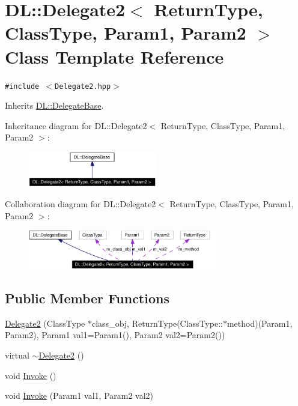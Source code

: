 \hypertarget{classDL_1_1Delegate2}{
\section{DL::Delegate2$<$ Return\-Type, Class\-Type, Param1, Param2 $>$ Class Template Reference}
\label{classDL_1_1Delegate2}
}
{\tt \#include $<$Delegate2.hpp$>$}

Inherits \hyperlink{classDL_1_1DelegateBase}{DL::Delegate\-Base}.

Inheritance diagram for DL::Delegate2$<$ Return\-Type, Class\-Type, Param1, Param2 $>$:\begin{figure}[H]
\begin{center}
\leavevmode
\includegraphics[width=158pt]{classDL_1_1Delegate2__inherit__graph}
\end{center}
\end{figure}
Collaboration diagram for DL::Delegate2$<$ Return\-Type, Class\-Type, Param1, Param2 $>$:\begin{figure}[H]
\begin{center}
\leavevmode
\includegraphics[width=234pt]{classDL_1_1Delegate2__coll__graph}
\end{center}
\end{figure}
\subsection*{Public Member Functions}
\begin{CompactItemize}
\item 
\hyperlink{classDL_1_1Delegate2_a0}{Delegate2} (Class\-Type $\ast$class\_\-obj, Return\-Type(Class\-Type::$\ast$method)(Param1, Param2), Param1 val1=Param1(), Param2 val2=Param2())
\item 
virtual \hyperlink{classDL_1_1Delegate2_a1}{$\sim$Delegate2} ()
\item 
void \hyperlink{classDL_1_1Delegate2_a2}{Invoke} ()
\item 
void \hyperlink{classDL_1_1Delegate2_a3}{Invoke} (Param1 val1, Param2 val2)
\end{CompactItemize}
